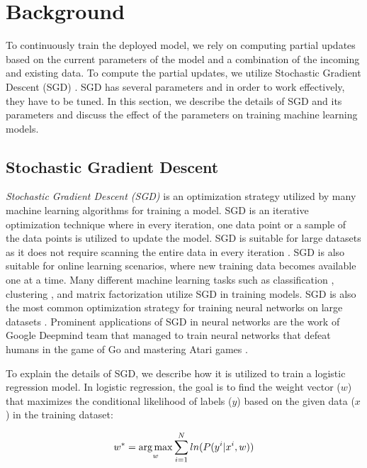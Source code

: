 \section{Background} \label{background}
To continuously train the deployed model, we rely on computing partial updates based on the current parameters of the model and a combination of the incoming and existing data.
To compute the partial updates, we utilize Stochastic Gradient Descent (SGD) \cite{zhang2004solving}.
SGD has several parameters and in order to work effectively, they have to be tuned.
In this section, we describe the details of SGD and its parameters and discuss the effect of the parameters on training machine learning models.

\subsection{Stochastic Gradient Descent} \label{sgd}
\textit{Stochastic Gradient Descent (SGD)} is an optimization strategy utilized by many machine learning algorithms for training a model.
SGD is an iterative optimization technique where in every iteration, one data point or a sample of the data points is utilized to update the model.
SGD is suitable for large datasets as it does not require scanning the entire data in every iteration \cite{bottou2010large}.
SGD is also suitable for online learning scenarios, where new training data becomes available one at a time.
Many different machine learning tasks such as classification \cite{zhang2004solving, macmahan2013}, clustering \cite{bottou1995convergence}, and matrix factorization \cite{koren2009matrix,  funk2006netflix} utilize SGD in training models.
SGD is also the most common optimization strategy for training neural networks on large datasets \cite{dean2012large}.
Prominent applications of SGD in neural networks are the work of Google Deepmind team that managed to train neural networks that defeat humans in the game of Go \cite{silver2016mastering} and mastering Atari games \cite{mnih2013playing}.

To explain the details of SGD, we describe how it is utilized to train a logistic regression model.
In logistic regression, the goal is to find the weight vector ($w$) that maximizes the conditional likelihood of labels ($y$) based on the given data ($x$) in the training dataset:

\begin{center}
$$w^* = \operatorname*{arg\,max}_w \sum_{i=1}^{N} ln(P(y^i | x^i, w))$$
\end{center}

